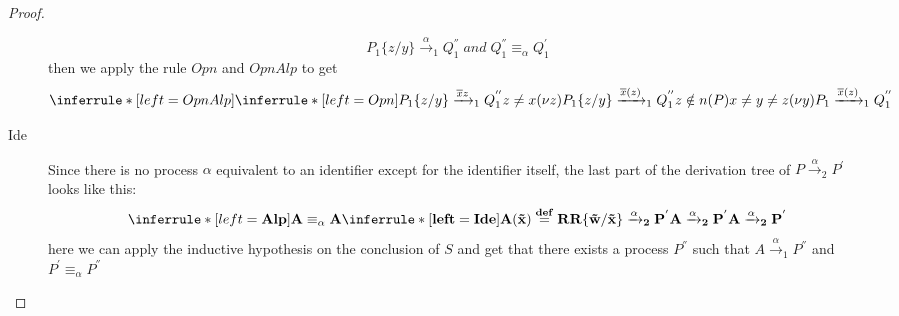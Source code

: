 \begin{theorem}
\begin{proof}
\begin{description}
		\[
		  P_{1}\{z/y\}\xrightarrow{\alpha}_{1}Q_{1}^{''}\;and\; Q_{1}^{''}\equiv_{\alpha}Q_{1}^{'}
		\]
		then we apply the rule $Opn$ and $OpnAlp$ to get
		\[
		  \inferrule* [left=OpnAlp]{
		      \inferrule* [left=Opn]{
			  P_{1}\{z/y\} \xrightarrow{\overline{x}z}_{1}Q_{1}^{''}
			\\
			  z\neq x
		      }{
			(\nu z)P_{1}\{z/y\} \xrightarrow{\overline{x}(z)}_{1}Q_{1}^{''}
		      }
		    \\
		      z\notin n(P)
		    \\
		      x\neq y\neq z
		  }{
		    (\nu y)P_{1} \xrightarrow{\overline{x}(z)}_{1}Q_{1}^{''}
		  }
		\]
	  \item[Ide]
	    Since there is no process $\alpha$ equivalent to an identifier except for the identifier itself, the last part of the derivation tree of $P\xrightarrow{\alpha}_{2}P^{'}$ looks like this:
 		\[
 		  \inferrule* [left=\bf{\bf{Alp}}]{
 		      A \equiv_{\alpha} A
 		    \\
 		      \inferrule* [left=\bf{Ide}]{
 			  A(\tilde{x}) \stackrel{def}{=} R
 			\\
 			  R\{\tilde{w}/\tilde{x}\} \xrightarrow{\alpha}_{2} P^{'}
 		      }{
 			A \xrightarrow{\alpha}_{2} P^{'}
 		      }
 		  }{
 		    A \xrightarrow{\alpha}_{2} P^{'}
 		  }
 		\]
	    here we can apply the inductive hypothesis on the conclusion of $S$ and get that there exists a process $P^{''}$ such that $A\xrightarrow{\alpha}_{1}P^{''}$ and $P^{'}\equiv_{\alpha}P^{''}$
	\end{description}
  \end{proof}
\end{theorem}



